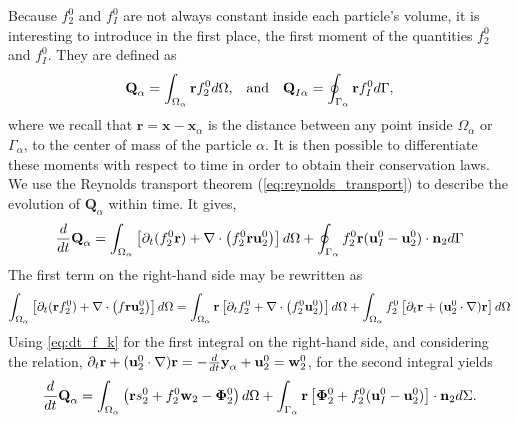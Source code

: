 Because $f_2^0$ and $f_I^0$ are not always constant inside each particle's volume, it is interesting to introduce in the first place, the first moment of the quantities $f_2^0$ and $f_I^0$. 
They are defined as
\begin{align}
    &\textbf{Q}_\alpha 
    = \int_{\Omega_\alpha}  \textbf{r} f_2^0  d\Omega,
    &\text{and}&
    &\textbf{Q}_{I\alpha}
    = \oint_{\Gamma_\alpha}  \textbf{r} f_I^0  d\Gamma,
    \label{eq:first_moment_definition}
\end{align}
where we recall that $\textbf{r} = \textbf{x} - \textbf{x}_\alpha$ is the distance between any point inside $\Omega_\alpha$ or $\Gamma_\alpha$, to the center of mass of the particle $\alpha$.
It is then possible to differentiate these moments with respect to time in order to obtain their conservation laws.
We use the Reynolds transport theorem (\ref{eq:reynolds_transport}) to describe the evolution of $\textbf{Q}_\alpha$ within time. 
It gives, 
\begin{equation*}
    \frac{d}{dt} \textbf{Q}_\alpha
      =  \int_{\Omega_\alpha} \left[
        \partial_t(  f_2^0\textbf{r})
        + \mathbf{\nabla}\cdot \left(  f_2^0 \textbf{r}\textbf{u}_2^0\right)
    \right] d\Omega 
    + \oint_{\Gamma_\alpha}   f_2^0 \textbf{r}  (\textbf{u}_I^0-\textbf{u}_2^0)\cdot \textbf{n}_2 d\Gamma
\end{equation*}
The first term on the right-hand side may be rewritten as
\begin{equation*}
\int_{\Omega_\alpha}  \left[
        \partial_t(\textbf{r}  f_2^0)+ \mathbf{\nabla}\cdot \left(f \textbf{r} \textbf{u}_2^0\right) 
    \right] d\Omega
    = \int_{\Omega_\alpha} \textbf{r}\left[
        \partial_t f_2^0
        + \mathbf{\nabla}\cdot \left(f_2^0 \textbf{u}_2^0\right)
    \right]  d\Omega
    + \int_{\Omega_\alpha}  f_2^0 \left[
        \partial_t \textbf{r}
        +(\textbf{u}_2^0 \cdot \mathbf{\nabla}) \textbf{r}
    \right] d\Omega
\end{equation*}
Using \ref{eq:dt_f_k} for the first integral on the right-hand side, and considering the relation,
$  \partial_t \textbf{r}
+ (\textbf{u}_2^0 \cdot \mathbf{\nabla}) \textbf{r}
= - \frac{d}{dt} \textbf{y}_\alpha  + \textbf{u}_2^0 
= \textbf{w}_2^0$,
for the second integral yields 
\begin{align}
    \frac{d}{dt} \textbf{Q}_\alpha
    = \int_{\Omega_\alpha} \left( 
        \textbf{r} s_2^0  
        + f_2^0  \textbf{w}_2 
        - \bm\Phi_2^0
    \right)  d\Omega
    + \int_{\Gamma_\alpha} \textbf{r} \left[
        \bm\Phi_2^0
        + f_2^0 (\textbf{u}_I^0-\textbf{u}_2^0)
    \right]\cdot \textbf{n}_2  d\Sigma.
    \label{eq:dt_Q_alpha}
\end{align}
